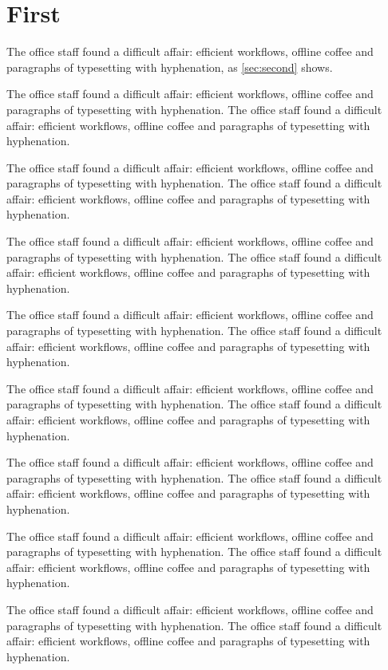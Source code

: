 \documentclass[11pt]{article}
\begin{document}
\section{First}
The office staff found a difficult affair: efficient workflows, offline coffee and paragraphs of typesetting with hyphenation, as \ref{sec:second} shows.

The office staff found a difficult affair: efficient workflows, offline coffee and paragraphs of typesetting with hyphenation. The office staff found a difficult affair: efficient workflows, offline coffee and paragraphs of typesetting with hyphenation.

The office staff found a difficult affair: efficient workflows, offline coffee and paragraphs of typesetting with hyphenation. The office staff found a difficult affair: efficient workflows, offline coffee and paragraphs of typesetting with hyphenation.

The office staff found a difficult affair: efficient workflows, offline coffee and paragraphs of typesetting with hyphenation. The office staff found a difficult affair: efficient workflows, offline coffee and paragraphs of typesetting with hyphenation.

The office staff found a difficult affair: efficient workflows, offline coffee and paragraphs of typesetting with hyphenation. The office staff found a difficult affair: efficient workflows, offline coffee and paragraphs of typesetting with hyphenation.

The office staff found a difficult affair: efficient workflows, offline coffee and paragraphs of typesetting with hyphenation. The office staff found a difficult affair: efficient workflows, offline coffee and paragraphs of typesetting with hyphenation.

The office staff found a difficult affair: efficient workflows, offline coffee and paragraphs of typesetting with hyphenation. The office staff found a difficult affair: efficient workflows, offline coffee and paragraphs of typesetting with hyphenation.

The office staff found a difficult affair: efficient workflows, offline coffee and paragraphs of typesetting with hyphenation. The office staff found a difficult affair: efficient workflows, offline coffee and paragraphs of typesetting with hyphenation.

The office staff found a difficult affair: efficient workflows, offline coffee and paragraphs of typesetting with hyphenation. The office staff found a difficult affair: efficient workflows, offline coffee and paragraphs of typesetting with hyphenation.
\end{document}
